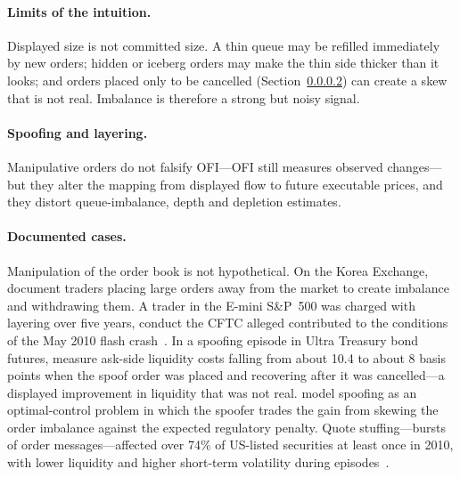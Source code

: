 \paragraph{Limits of the intuition.} Displayed size is not committed size. A thin queue may be
refilled immediately by new orders; hidden or iceberg orders may make the thin side thicker than it
looks; and orders placed only to be cancelled (Section~\ref{sec:spoofing}) can create a
skew that is not real. Imbalance is therefore a strong but noisy signal.

\paragraph{Spoofing and layering.}\label{sec:spoofing} Manipulative orders do not falsify OFI---OFI still measures observed changes---but they alter the
mapping from displayed flow to future executable prices, and they distort queue-imbalance, depth
and depletion estimates.

\paragraph{Documented cases.} Manipulation of the order book is not hypothetical. On the Korea Exchange,
\citet{lee2013spoof} document traders placing large orders away from the market to create imbalance and
withdrawing them. A trader in the E-mini S\&P~500 was charged with layering over five years, conduct the
CFTC alleged contributed to the conditions of the May 2010 flash crash~\citep{cftc2015sarao}.
In a spoofing episode in Ultra Treasury bond futures, \citet{debie2023} measure ask-side
liquidity costs falling from about 10.4 to about 8 basis points when the spoof order was placed and
recovering after it was cancelled---a displayed improvement in liquidity that was not real.
\citet{cartea2020spoof} model spoofing as an optimal-control problem in which the spoofer trades the gain
from skewing the order imbalance against the expected regulatory penalty. Quote stuffing---bursts of
order messages---affected over 74\% of US-listed securities at least once in 2010, with lower liquidity
and higher short-term volatility during episodes~\citep{egginton2016}.


